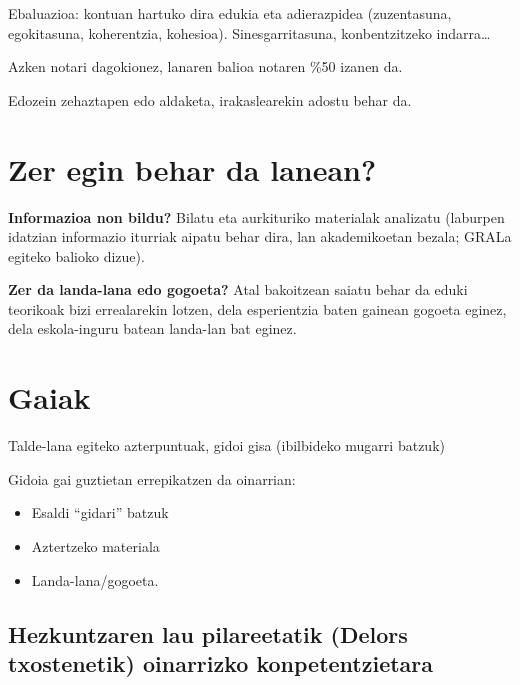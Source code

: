 \documentclass[
]{book}
\providecommand{\tightlist}{%
  \setlength{\itemsep}{0pt}\setlength{\parskip}{0pt}}
\begin{document}
Ebaluazioa: kontuan hartuko dira edukia eta adierazpidea (zuzentasuna, egokitasuna, koherentzia, kohesioa). Sinesgarritasuna, konbentzitzeko indarra\ldots{}

Azken notari dagokionez, lanaren balioa notaren \%50 izanen da.

Edozein zehaztapen edo aldaketa, irakaslearekin adostu behar da.

\hypertarget{zer-egin-behar-da-lanean}{%
\section*{Zer egin behar da lanean?}\label{zer-egin-behar-da-lanean}}

\textbf{Informazioa non bildu?} Bilatu eta aurkituriko materialak analizatu (laburpen idatzian informazio iturriak aipatu behar dira, lan akademikoetan bezala; GRALa egiteko balioko dizue).

\textbf{Zer da landa-lana edo gogoeta?} Atal bakoitzean saiatu behar da eduki teorikoak bizi errealarekin lotzen, dela esperientzia baten gainean gogoeta eginez, dela eskola-inguru batean landa-lan bat eginez.

\hypertarget{gaiak}{%
\section*{Gaiak}\label{gaiak}}

Talde-lana egiteko azterpuntuak, gidoi gisa (ibilbideko mugarri batzuk)

Gidoia gai guztietan errepikatzen da oinarrian:

\begin{itemize}
\tightlist
\item
  Esaldi ``gidari'' batzuk
\item
  Aztertzeko materiala
\item
  Landa-lana/gogoeta.
\end{itemize}

\hypertarget{hezkuntzaren-lau-pilareetatik-delors-txostenetik-oinarrizko-konpetentzietara}{%
\subsection*{Hezkuntzaren lau pilareetatik (Delors txostenetik) oinarrizko konpetentzietara}\label{hezkuntzaren-lau-pilareetatik-delors-txostenetik-oinarrizko-konpetentzietara}}
\end{document}
